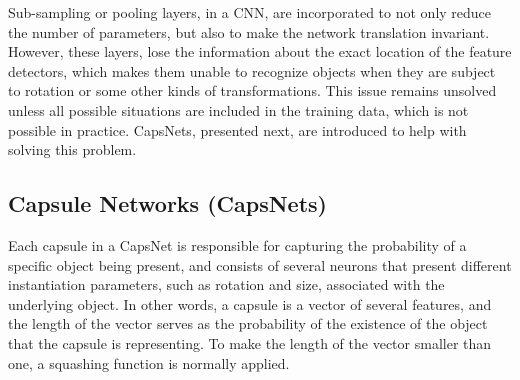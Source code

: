 \documentclass{article}
\begin{document}
Sub-sampling or pooling layers, in a CNN, are incorporated to not only reduce the number of parameters, but also to make the network translation invariant. However, these layers, lose the information about the exact location of the feature detectors, which makes them unable to recognize objects when they are subject to rotation or some other kinds of transformations. This issue remains unsolved unless all possible situations are included in the training data, which is not possible in practice. CapsNets, presented next, are introduced to help with solving this problem.

\subsection{Capsule Networks (CapsNets)} \label{sec:caps}
Each capsule in a CapsNet is responsible for capturing the probability of a specific object being present, and consists of several neurons that present different instantiation parameters, such as rotation and size, associated with the underlying object. In other words, a capsule is a vector of several features, and the length of the vector serves as the probability of the existence of the object that the capsule is representing. To make the length of the vector smaller than one, a squashing function is normally applied.
\end{document}

